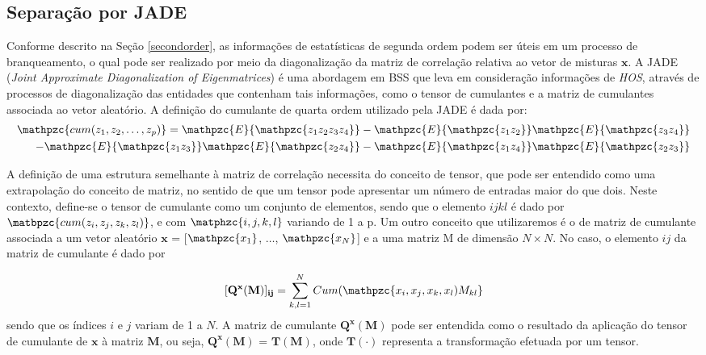     \subsection{Separação por JADE}
        Conforme descrito na Seção \ref{secondorder}, as informações de estatísticas de segunda ordem podem ser úteis em um processo de branqueamento, o qual pode ser realizado por meio da diagonalização da matriz de correlação relativa ao vetor de misturas $\mathbf{x}$. A JADE (\textit{Joint Approximate Diagonalization of Eigenmatrices})\cite{JADE} é uma abordagem em BSS que leva em consideração informações de \textit{HOS}, através de processos de diagonalização das entidades que contenham tais informações, como o tensor de cumulantes e a matriz de cumulantes associada ao vetor aleatório. A definição do cumulante de quarta ordem utilizado pela JADE é dada por:
    \begin{equation}
        \label{cumJADE}
        \begin{split}
        \mathpzc{cum(z_1,z_2,\dots,z_p)} = \mathpzc{E}\{\mathpzc{z_1z_2z_3z_4}\} - \mathpzc{E}\{\mathpzc{z_1z_2}\}\mathpzc{E}\{\mathpzc{z_3z_4}\} & \\ - \mathpzc{E}\{\mathpzc{z_1z_3}\}\mathpzc{E}\{\mathpzc{z_2z_4}\} - \mathpzc{E}\{\mathpzc{z_1z_4}\}\mathpzc{E}\{\mathpzc{z_2z_3}\}    
        \end{split}
    \end{equation}
    
    A definição de uma estrutura semelhante à matriz de correlação necessita do conceito de tensor, que pode ser entendido como uma extrapolação do conceito de matriz, no sentido de que um tensor pode apresentar um número de  entradas maior do que dois. Neste contexto, define-se o tensor de cumulante como um conjunto de elementos, sendo que o elemento ${ijkl}$ é dado por $\matbpzc{cum(z_i, z_j, z_k, z_l)}$, e com $\matphzc{i,j,k,l}$ variando de 1 a p.
    Um outro conceito que utilizaremos é o de matriz de cumulante associada a um vetor aleatório $\mathbf{x}$ = [$\mathpzc{x_1}$, $\dots$,  $\mathpzc{x_N}$] e a uma matriz M de dimensão $N \times N$. No caso, o elemento $ij$ da matriz de cumulante é dado por
    
    \begin{equation}
        \mathbf{[Q^x(M)]_{ij}} = \sum_{k,l=1}^N Cum(\mathpzc{x_i,x_j,x_k,x_l)M_{kl}}
    \end{equation}
    sendo que os índices $i$ e $j$ variam de 1 a $N$. A matriz de cumulante $\mathbf{Q^x(M)}$ pode ser entendida como o resultado da aplicação do tensor de cumulante de $\mathbf{x}$ à matriz $\mathbf{M}$, ou seja, $\mathbf{Q^x(M)}$ = $\mathbf{T(M)}$, onde $\mathbf{T(\cdot)}$ representa a transformação efetuada por um tensor.
    
